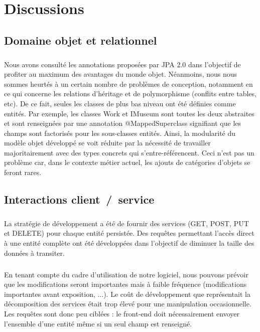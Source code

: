 \chapter{Discussions}
\section{Domaine objet et relationnel}
\paragraph{}
Nous avons consulté les annotations proposées par JPA 2.0 dans l'objectif de profiter au maximum des avantages du monde objet. Néanmoins, nous nous sommes heurtés à un certain nombre de problèmes de conception, notamment en ce qui concerne les relations d'héritage et de polymorphisme (conflits entre tables, etc). De ce fait, seules les classes de plus bas niveau ont été définies comme entités. Par exemple, les classes Work et IMuseum sont toutes les deux abstraites et sont renseignées par une annotation \og{}@MappedSuperclass\fg{} signifiant que les champs sont factorisés pour les sous-classes entités. Ainsi, la modularité du modèle objet développé se voit réduite par la nécessité de travailler majoritairement avec des types concrets qui s'entre-référencent. Ceci n'est pas un problème car, dans le contexte métier actuel, les ajouts de catégories d'objets se feront rares.

\section{Interactions client~/~service}
\paragraph{}
La stratégie de développement a été de fournir des services (GET, POST, PUT et DELETE) pour chaque entité persistée. Des requêtes permettant l'accès direct à une entité complète ont été développées dans l'objectif de diminuer la taille des données à transiter.
\paragraph{}
En tenant compte du cadre d'utilisation de notre logiciel, nous pouvons prévoir que les modifications seront importantes mais à faible fréquence (modifications importantes avant exposition, ...). Le coût de développement que représentait la décomposition des services était trop élevé pour une manipulation occasionnelle. Les requêtes sont donc peu ciblées : le front-end doit nécessairement envoyer l'ensemble d'une entité même si un seul champ est renseigné.
